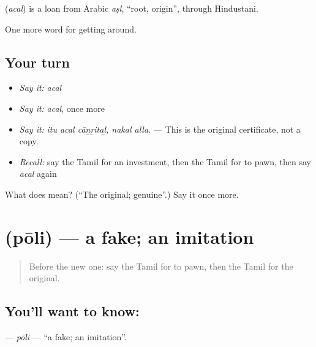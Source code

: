 \begin{cousinweb}
\textbf{} (\emph{acal}) is a loan from Arabic \emph{aṣl}, \textquotedblleft{}root, origin\textquotedblright{}, through Hindustani.
\end{cousinweb}

\begin{grammarlens}[title={What you've built}]
One more word for getting around.
\end{grammarlens}

\subsection*{Your turn}
\begin{itemize}
\raggedright
  \item \emph{Say it:} \emph{acal}
  \item \emph{Say it:} \emph{acal}, once more
  \item \emph{Say it:} \emph{itu acal cāṉṟitaḻ, nakal alla.} — This is the original certificate, not a copy.
  \item \emph{Recall:} say the Tamil for an investment, then the Tamil for to pawn, then say \emph{acal} again
\end{itemize}

\begin{tcolorbox}[breakable,colback=teal!4,colframe=teal!35!black,title={Before you move on}]
What does  mean? (\textquotedblleft{}The original; genuine\textquotedblright{}.) Say it once more.
\end{tcolorbox}
\section[\texorpdfstring{\ta{போலி} (pōli)}{போலி (pōli)}]{ (pōli) — a fake; an imitation}

\label{lesson:TA-C450-poli-fake}



\begin{quote}
Before the new one: say the Tamil for to pawn, then the Tamil for the original.
\end{quote}

\subsection*{You'll want to know: }
\textbf{} — \emph{pōli} — \textquotedblleft{}a fake; an imitation\textquotedblright{}.

